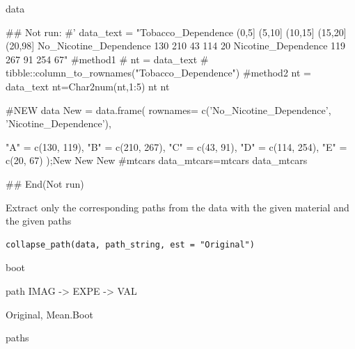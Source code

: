 \documentclass[a4paper]{book}
\begin{document}
%
\begin{Value}
data
\end{Value}
%
\begin{Examples}
\begin{ExampleCode}

## Not run: 
#'
data_text = "Tobacco_Dependence (0,5] (5,10] (10,15] (15,20] (20,98]
No_Nicotine_Dependence 130 210 43 114 20
Nicotine_Dependence 119 267 91 254 67"
#method1
# nt = data_text%
#         tibble::column_to_rownames("Tobacco_Dependence")
#method2
nt = data_text%
nt=Char2num(nt,1:5)
nt
nt %

#NEW data
New = data.frame(
  rownames= c('No_Nicotine_Dependence', 'Nicotine_Dependence'),

  "A" = c(130, 119),
  "B" = c(210, 267),
  "C" = c(43, 91),
  "D" = c(114, 254),
  "E" = c(20, 67)
);New
New%
New%
#mtcars
data_mtcars=mtcars%
data_mtcars%




## End(Not run)


\end{ExampleCode}
\end{Examples}
%
\begin{Description}
Extract only the corresponding paths from the data with the given material and the given paths
\end{Description}
%
\begin{Usage}
\begin{verbatim}
collapse_path(data, path_string, est = "Original")
\end{verbatim}
\end{Usage}
%
\begin{Arguments}
\begin{ldescription}
\item[\code{data}] boot

\item[\code{path\_string}] path IMAG -> EXPE -> VAL

\item[\code{est}] Original, Mean.Boot
\end{ldescription}
\end{Arguments}
%
\begin{Value}
paths
\end{Value}
\end{document}
